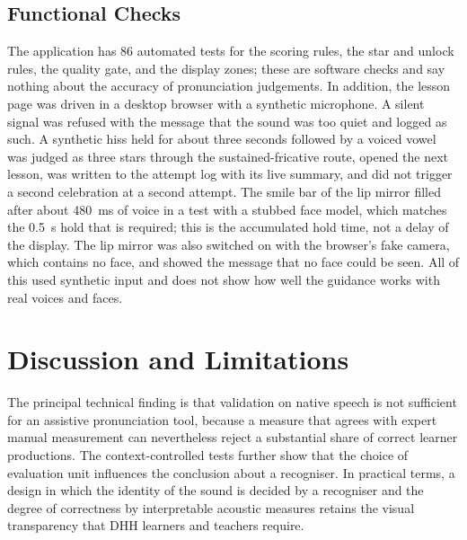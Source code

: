 \documentclass[conference]{IEEEtran}
\begin{document}
\subsection{Functional Checks}
The application has 86 automated tests for the scoring rules, the star and unlock rules, the quality gate, and the display zones; these are software checks and say nothing about the accuracy of pronunciation judgements. In addition, the lesson page was driven in a desktop browser with a synthetic microphone. A silent signal was refused with the message that the sound was too quiet and logged as such. A synthetic hiss held for about three seconds followed by a voiced vowel was judged as three stars through the sustained-fricative route, opened the next lesson, was written to the attempt log with its live summary, and did not trigger a second celebration at a second attempt. The smile bar of the lip mirror filled after about 480~ms of voice in a test with a stubbed face model, which matches the 0.5~s hold that is required; this is the accumulated hold time, not a delay of the display. The lip mirror was also switched on with the browser's fake camera, which contains no face, and showed the message that no face could be seen. All of this used synthetic input and does not show how well the guidance works with real voices and faces.

\section{Discussion and Limitations}\label{sec:disc}
The principal technical finding is that validation on native speech is not sufficient for an assistive pronunciation tool, because a measure that agrees with expert manual measurement can nevertheless reject a substantial share of correct learner productions. The context-controlled tests further show that the choice of evaluation unit influences the conclusion about a recogniser. In practical terms, a design in which the identity of the sound is decided by a recogniser and the degree of correctness by interpretable acoustic measures retains the visual transparency that DHH learners and teachers require.
\end{document}
